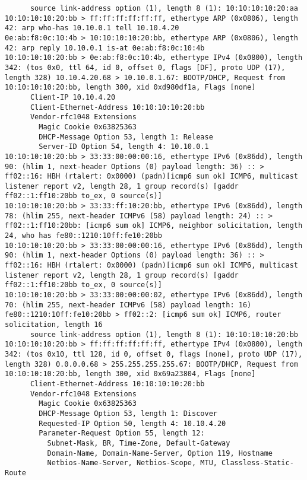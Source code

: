 \documentclass[a4paper,12pt]{article}
\begin{document}
\begin{Verbatim}
	  source link-address option (1), length 8 (1): 10:10:10:10:20:aa
10:10:10:10:20:bb > ff:ff:ff:ff:ff:ff, ethertype ARP (0x0806), length 42: arp who-has 10.10.0.1 tell 10.10.4.20
0e:ab:f8:0c:10:4b > 10:10:10:10:20:bb, ethertype ARP (0x0806), length 42: arp reply 10.10.0.1 is-at 0e:ab:f8:0c:10:4b
10:10:10:10:20:bb > 0e:ab:f8:0c:10:4b, ethertype IPv4 (0x0800), length 342: (tos 0x0, ttl 64, id 0, offset 0, flags [DF], proto UDP (17), length 328) 10.10.4.20.68 > 10.10.0.1.67: BOOTP/DHCP, Request from 10:10:10:10:20:bb, length 300, xid 0xd980df1a, Flags [none]
	  Client-IP 10.10.4.20
	  Client-Ethernet-Address 10:10:10:10:20:bb
	  Vendor-rfc1048 Extensions
	    Magic Cookie 0x63825363
	    DHCP-Message Option 53, length 1: Release
	    Server-ID Option 54, length 4: 10.10.0.1
10:10:10:10:20:bb > 33:33:00:00:00:16, ethertype IPv6 (0x86dd), length 90: (hlim 1, next-header Options (0) payload length: 36) :: > ff02::16: HBH (rtalert: 0x0000) (padn)[icmp6 sum ok] ICMP6, multicast listener report v2, length 28, 1 group record(s) [gaddr ff02::1:ff10:20bb to_ex, 0 source(s)]
10:10:10:10:20:bb > 33:33:ff:10:20:bb, ethertype IPv6 (0x86dd), length 78: (hlim 255, next-header ICMPv6 (58) payload length: 24) :: > ff02::1:ff10:20bb: [icmp6 sum ok] ICMP6, neighbor solicitation, length 24, who has fe80::1210:10ff:fe10:20bb
10:10:10:10:20:bb > 33:33:00:00:00:16, ethertype IPv6 (0x86dd), length 90: (hlim 1, next-header Options (0) payload length: 36) :: > ff02::16: HBH (rtalert: 0x0000) (padn)[icmp6 sum ok] ICMP6, multicast listener report v2, length 28, 1 group record(s) [gaddr ff02::1:ff10:20bb to_ex, 0 source(s)]
10:10:10:10:20:bb > 33:33:00:00:00:02, ethertype IPv6 (0x86dd), length 70: (hlim 255, next-header ICMPv6 (58) payload length: 16) fe80::1210:10ff:fe10:20bb > ff02::2: [icmp6 sum ok] ICMP6, router solicitation, length 16
	  source link-address option (1), length 8 (1): 10:10:10:10:20:bb
10:10:10:10:20:bb > ff:ff:ff:ff:ff:ff, ethertype IPv4 (0x0800), length 342: (tos 0x10, ttl 128, id 0, offset 0, flags [none], proto UDP (17), length 328) 0.0.0.0.68 > 255.255.255.255.67: BOOTP/DHCP, Request from 10:10:10:10:20:bb, length 300, xid 0x69a23804, Flags [none]
	  Client-Ethernet-Address 10:10:10:10:20:bb
	  Vendor-rfc1048 Extensions
	    Magic Cookie 0x63825363
	    DHCP-Message Option 53, length 1: Discover
	    Requested-IP Option 50, length 4: 10.10.4.20
	    Parameter-Request Option 55, length 12: 
	      Subnet-Mask, BR, Time-Zone, Default-Gateway
	      Domain-Name, Domain-Name-Server, Option 119, Hostname
	      Netbios-Name-Server, Netbios-Scope, MTU, Classless-Static-Route

\end{Verbatim}
\end{document}
